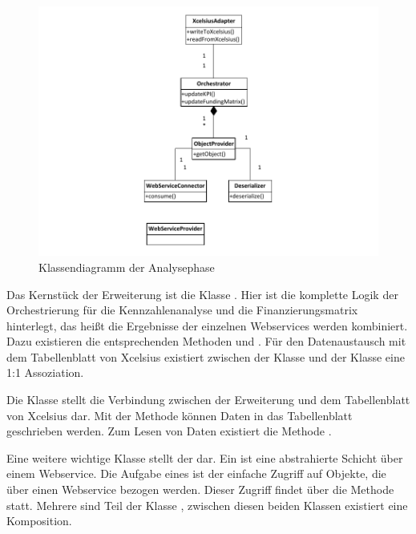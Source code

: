 \begin{onehalfspacing}
\begin{figure}[ht]
\centering
\setlength{\unitlength}{1mm}
\includegraphics[width=15cm]{Visio/Analyse.pdf}
\caption{Klassendiagramm der Analysephase \label{fig:klassendiagramm_analyse}}
\end{figure}

Das Kernstück der Erweiterung ist die Klasse . Hier ist die komplette Logik der Orchestrierung für die Kennzahlenanalyse und die Finanzierungsmatrix hinterlegt, das heißt die Ergebnisse der einzelnen Webservices werden kombiniert. Dazu existieren die entsprechenden Methoden  und . Für den Datenaustausch mit dem Tabellenblatt von \gls{Xcelsius} existiert zwischen der Klasse  und der Klasse  eine 1:1 Assoziation.

Die Klasse  stellt die Verbindung zwischen der Erweiterung und dem Tabellenblatt von \gls{Xcelsius} dar. Mit der Methode  können Daten in das Tabellenblatt geschrieben werden. Zum Lesen von Daten existiert die Methode .

Eine weitere wichtige Klasse stellt der  dar. Ein  ist eine abstrahierte Schicht über einem Webservice. Die Aufgabe eines  ist der einfache Zugriff auf Objekte, die über einen Webservice bezogen werden. Dieser Zugriff findet über die Methode  statt. Mehrere  sind Teil der Klasse , zwischen diesen beiden Klassen existiert eine Komposition.


\end{onehalfspacing}
